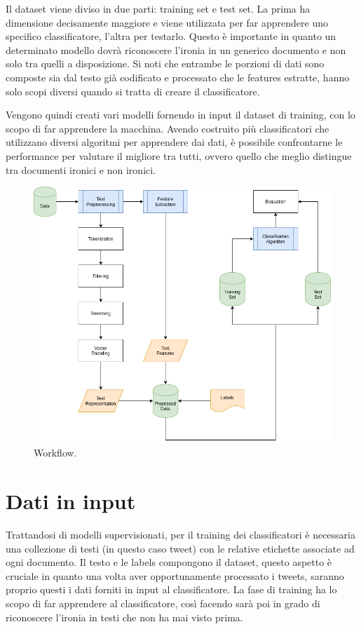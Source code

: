 \documentclass[oneside]{book}
\begin{document}
Il dataset viene diviso in due parti: training set e test set. La prima ha dimensione decisamente maggiore e viene utilizzata per far apprendere uno specifico classificatore, l'altra per testarlo. Questo è importante in quanto un determinato modello dovrà riconoscere l'ironia in un generico documento e non solo tra quelli a disposizione. Si noti che entrambe le porzioni di dati sono composte sia dal testo già codificato e processato che le features estratte, hanno solo scopi diversi quando si tratta di creare il classificatore. 

Vengono quindi creati vari modelli fornendo in input il dataset di training, con lo scopo di far apprendere la macchina. Avendo costruito più classificatori che utilizzano diversi algoritmi per apprendere dai dati, è possibile confrontarne le performance per valutare il migliore tra tutti, ovvero quello che meglio distingue tra documenti ironici e non ironici.

\begin{figure}
	\includegraphics[width=\linewidth]{assets/Workflow.png}
	\caption{Workflow.}
	\label{fig:workflow}
\end{figure}


\clearpage

\section{Dati in input}
Trattandosi di modelli supervisionati, per il training dei classificatori è necessaria una collezione di testi (in questo caso tweet) con le relative etichette associate ad ogni documento. Il testo e le labels compongono il dataset, questo aspetto è cruciale in quanto una volta aver opportunamente processato i tweets, saranno proprio questi i dati forniti in input al classificatore. La fase di training ha lo scopo di far apprendere al classificatore, così facendo sarà poi in grado di riconoscere l'ironia in testi che non ha mai visto prima.
\end{document}
